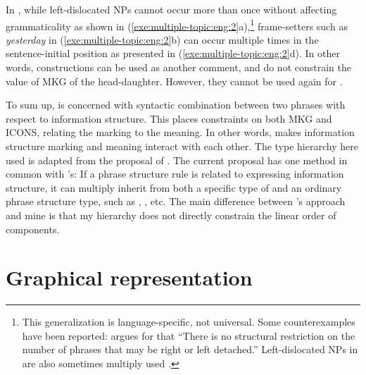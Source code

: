 In , while left-dislocated NPs cannot occur more than
once without affecting grammaticality as shown in
(\ref{exe:multiple-topic:eng:2}a),\footnote{This generalization is
  language-specific, not universal.  Some counterexamples have been
  reported: \citet[123]{vallduvi:93} argues for  that
  ``There is no structural restriction on the number of phrases that
  may be right or left detached.''  Left-dislocated NPs in
   are also sometimes multiply used
  \citep[224]{zagona:02}.}  frame-setters such as
\textit{yesterday} in (\ref{exe:multiple-topic:eng:2}b) can occur
multiple times in the sentence-initial position as presented in
(\ref{exe:multiple-topic:eng:2}d). In other words,
 constructions can be used as another comment, and
do not constrain the value of MKG of the head-daughter.
However, they cannot be used again for .

 



To sum up,  is concerned with
syntactic combination between two phrases with respect to information
structure.  This places constraints on both MKG and ICONS, relating
the marking to the meaning. In other words,  makes
information structure marking and meaning interact with each other.
The type hierarchy here used is adapted from the proposal of
\citet{paggio:09}. The current proposal has one method in common with
\citeauthor{paggio:09}'s: If a phrase structure rule is related to
expressing information structure, it can multiply inherit from both a
specific type of  and an ordinary phrase structure type,
such as , , etc. The main
difference between \citeauthor{paggio:09}'s approach and mine is that
my  hierarchy does not directly constrain the linear order
of components.



\section{Graphical representation}
\label{9:sec:graph}



